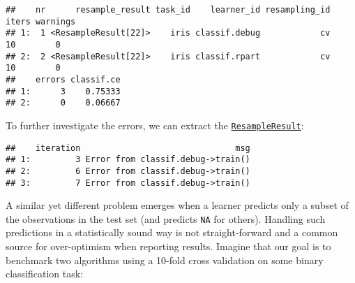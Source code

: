 \documentclass[
]{scrbook}
\newenvironment{Shaded}{\begin{snugshade}}{\end{snugshade}}
\newcommand{\AttributeTok}[1]{\textcolor[rgb]{0.77,0.63,0.00}{#1}}
\newcommand{\ConstantTok}[1]{\textcolor[rgb]{0.00,0.00,0.00}{#1}}
\newcommand{\FloatTok}[1]{\textcolor[rgb]{0.00,0.00,0.81}{#1}}
\newcommand{\FunctionTok}[1]{\textcolor[rgb]{0.00,0.00,0.00}{#1}}
\newcommand{\NormalTok}[1]{#1}
\newcommand{\OtherTok}[1]{\textcolor[rgb]{0.56,0.35,0.01}{#1}}
\newcommand{\SpecialCharTok}[1]{\textcolor[rgb]{0.00,0.00,0.00}{#1}}
\newcommand{\StringTok}[1]{\textcolor[rgb]{0.31,0.60,0.02}{#1}}
\renewenvironment{Shaded} {\begin{snugshade}\small} {\end{snugshade}}
\begin{document}
\begin{Shaded}
\end{Shaded}

\begin{verbatim}
##    nr      resample_result task_id    learner_id resampling_id iters warnings
## 1:  1 <ResampleResult[22]>    iris classif.debug            cv    10        0
## 2:  2 <ResampleResult[22]>    iris classif.rpart            cv    10        0
##    errors classif.ce
## 1:      3    0.75333
## 2:      0    0.06667
\end{verbatim}

To further investigate the errors, we can extract the \href{https://mlr3.mlr-org.com/reference/ResampleResult.html}{\texttt{ResampleResult}}:

\begin{Shaded}
\end{Shaded}

\begin{verbatim}
##    iteration                               msg
## 1:         3 Error from classif.debug->train()
## 2:         6 Error from classif.debug->train()
## 3:         7 Error from classif.debug->train()
\end{verbatim}

A similar yet different problem emerges when a learner predicts only a subset of the observations in the test set (and predicts \texttt{NA} for others).
Handling such predictions in a statistically sound way is not straight-forward and a common source for over-optimism when reporting results.
Imagine that our goal is to benchmark two algorithms using a 10-fold cross validation on some binary classification task:
\end{document}
